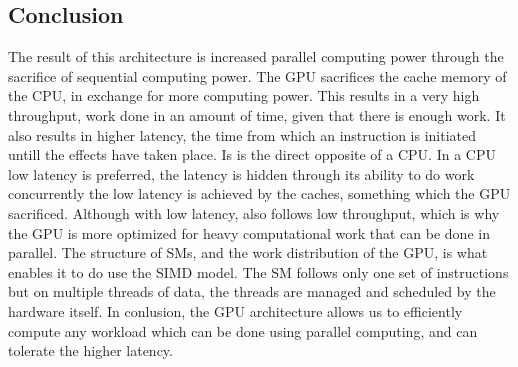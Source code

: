 \subsection{Conclusion}
The result of this architecture is increased parallel computing power through the sacrifice of sequential computing power.
The GPU sacrifices the cache memory of the CPU, in exchange for more computing power.
This results in a very high throughput, work done in an amount of time, given that there is enough work.
It also results in higher latency, the time from which an instruction is initiated untill the effects have taken place.
Is is the direct opposite of a CPU.
In a CPU low latency is preferred, the latency is hidden through its ability to do work concurrently the low latency is achieved by the caches, something which the GPU sacrificed.
Although with low latency, also follows low throughput, which is why the GPU is more optimized for heavy computational work that can be done in parallel.
The structure of SMs, and the work distribution of the GPU, is what enables it to do use the SIMD model.
The SM follows only one set of instructions but on multiple threads of data, the threads are managed and scheduled by the hardware itself.
In conlusion, the GPU architecture allows us to efficiently compute any workload which can be done using parallel computing, and can tolerate the higher latency.

